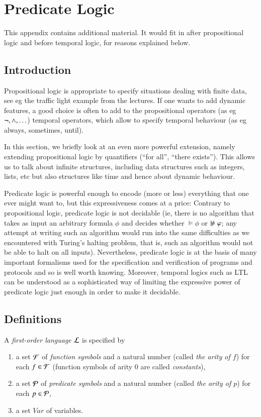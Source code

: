 \section{Predicate Logic}


This appendix contains additional material. It would fit in after
propositional logic and before temporal logic, for reasons explained
below.


\subsection{Introduction}

Propositional logic is appropriate to specify situations dealing with
finite data, see eg the traffic light example from the lectures. If
one wants to add dynamic features, a good choice is often to add to
the propositional operators (as eg $\neg,\wedge,\ldots$) temporal
operators, which allow to specify temporal behaviour (as eg always,
sometimes, until).

\medskip\noindent In this section, we briefly look at an even more
powerful extension, namely extending propositional logic by
quantifiers (``for all'', ``there exists''). This allows us to talk
about infinite structures, including data structures such as integers,
lists, etc but also structures like time and hence about dynamic
behaviour.

\medskip\noindent Predicate logic is powerful enough to encode (more
or less) everything that one ever might want to, but this
expressiveness comes at a price: Contrary to propositional logic,
predicate logic is not decidable (ie, there is no algorithm that takes
as input an arbitrary formula $\phi$ and decides whether $\models\phi$
or $\notmodels\phi$; any attempt at writing such an algorithm would
run into the same difficulties as we encountered with Turing's halting
problem, that is, such an algorithm would not be able to
halt on all inputs). Nevertheless, predicate logic is at the basis of
many important formalisms used for the specification and verification
of programs and protocols and so is well worth knowing. Moreover,
temporal logics such as LTL can be understood as a sophisticated way
of limiting the expressive power of predicate logic just enough in
order to make it decidable. 

\subsection{Definitions}

A  \emph{first-order language} $\cal L$ is specified by
\begin{enumerate}
\item a set $\cal F$ of \emph{function symbols} and a natural number
  (called \emph{the arity of $f$}) for each $f\in \cal F$ (function
  symbols of arity 0 are called \emph{constants}),
\item a set $\cal P$ of \emph{predicate symbols} and a natural number
  (called \emph{the arity of $p$}) for each $p\in \cal P$,
\item a set $\mathit{Var}$ of variables.
\end{enumerate}


